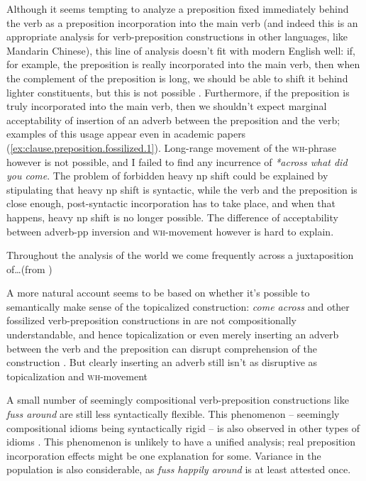 \documentclass[UTF8, a4paper, oneside, scheme=plain, 12pt]{ctexbook}
\newcommand*{\citesec}[1]{\S~{#1}}
\newcommand*{\citepage}[1]{p.~{#1}}
\newcommand{\form}[1]{\emph{#1}}
\newcommand{\category}[1]{\textsc{#1}}
\begin{document}
Although it seems tempting to analyze a preposition fixed immediately behind the verb as 
a preposition incorporation into the main verb
(and indeed this is an appropriate analysis for verb-preposition constructions in other languages, 
like Mandarin Chinese), 
this line of analysis doesn't fit with modern English well: 
if, for example, the preposition is really incorporated into the main verb, 
then when the complement of the preposition is long, 
we should be able to shift it behind lighter constituents, 
but this is not possible \citep[\citepage{277}]{cgel}.
Furthermore, if the preposition is truly incorporated into the main verb,
then we shouldn't expect marginal acceptability of 
insertion of an adverb between the preposition and the verb;
examples of this usage appear even in academic papers 
(\ref{ex:clause.preposition.fossilized.1}).
Long-range movement of the \category{wh}-phrase however is not possible, 
and I failed to find any incurrence of \form{*across what did you come}.
The problem of forbidden heavy \acs{np} shift  
could be explained by stipulating that 
heavy \acs{np} shift is syntactic,
while the verb and the preposition is close enough,
post-syntactic incorporation has to take place,
and when that happens, heavy \ac{np} shift is no longer possible.
The difference of acceptability between adverb-\acs{pp} inversion 
and \category{wh}-movement however is hard to explain.


\begin{exe}
    \ex\label{ex:clause.preposition.fossilized.1} Throughout the analysis of the world we come frequently across a
    juxtaposition of\dots (from \citet{biemel1980development})
\end{exe}


A more natural account seems to be based on whether it's possible 
to semantically make sense of the topicalized construction: 
\form{come across} and other fossilized verb-preposition constructions 
in \citet[\citepage{278}]{cgel} 
are not compositionally understandable, 
and hence topicalization or even merely inserting an adverb between the verb and the preposition
can disrupt comprehension of the construction \citep{nediger2017unifying}.
But clearly inserting an adverb still isn't as disruptive as topicalization and \category{wh}-movement 

A small number of seemingly compositional verb-preposition constructions like \form{fuss around} 
are still less syntactically flexible.
This phenomenon -- seemingly compositional idioms being syntactically rigid -- 
is also observed in other types of idioms \citep[\citesec{5.7.2}]{nediger2017unifying}.
This phenomenon is unlikely to have a unified analysis; 
real preposition incorporation effects might be one explanation for some.
Variance in the population is also considerable, 
as \form{fuss happily around} is at least attested once.
\end{document}
